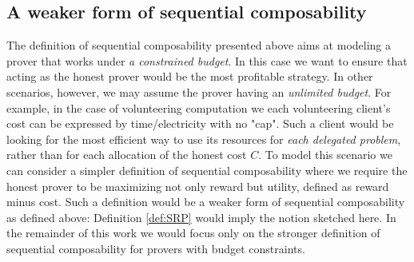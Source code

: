 \subsection{A weaker form of sequential composability}


The definition of sequential composability presented above aims at modeling a prover that works under \emph{a constrained budget}. In this case we want to ensure that acting as the honest prover would be the most profitable strategy.
In other scenarios, however, we may assume the prover having an \emph{unlimited budget}. For example, in the case of volunteering computation we each volunteering client's cost can be expressed by time/electricity with no "cap". Such a client would be looking for the most efficient way to use its resources for \emph{each delegated problem}, rather than for each allocation of the honest cost $C$.
To model this scenario we can consider a simpler definition of sequential composability where we require the honest prover to be maximizing not only reward but utility, defined as reward minus cost. 
Such a definition would be a weaker form of sequential composability as defined above: Definition \ref{def:SRP} would imply the notion sketched here. In the remainder of this work we would focus only on the stronger definition of sequential composability for provers with budget constraints.
